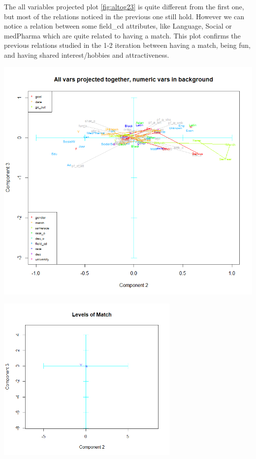 The all variables projected plot \ref{fig:altog23} is quite different from the first one, but most of the relations noticed in the previous one still hold. However we can notice a relation between some field\_cd attributes, like Language, Social or medPharma which are quite related to having a match. This plot confirms the previous relations studied in the 1-2 iteration between having a match, being fun, and having shared interest/hobbies and attractiveness.
\begin{center}
\includegraphics[width=\linewidth ,scale = 0.1]{images/ACP/2-3iteration/all-together-2-3.png}
\label{fig:altog23}
\end{center}

\begin{center}
\includegraphics[width=3.5in]{images/ACP/2-3iteration/b-2-3-match.png}
\label{fig:bmatch23}
\end{center}

